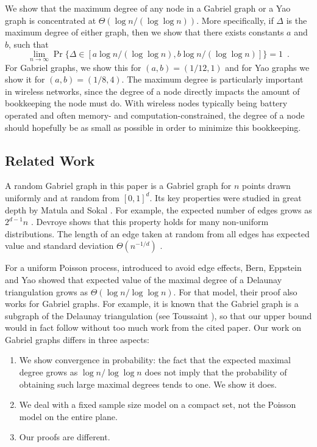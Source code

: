 \documentclass[lotsofwhite,charterfonts]{patmorin}
\newcommand{\PROB}{\Pr}
\begin{document}
We show that the maximum degree of any node in a Gabriel graph
or a Yao graph is concentrated at $\Theta(\log n/(\log\log n))$.
More specifically, if $\Delta$ is the maximum degree of either graph,
then we show that there exists constants $a$ and $b$, such that
\[
    \lim_{n\rightarrow\infty}
       \PROB\{\Delta\in [a\log n/(\log\log n), b\log n/(\log\log n)]\} = 1
       \enspace .
\]
For Gabriel graphs, we show this for $(a,b)=(1/12,1)$ and for Yao graphs
we show it for $(a,b)=(1/8,4)$.  The maximum degree is particularly
important in wireless networks, since the degree of a node directly impacts
the amount of bookkeeping the node must do.  With wireless nodes typically
being battery operated and often memory- and computation-constrained, the
degree of a node should hopefully be as small as possible in order to
minimize this bookkeeping.

\subsection{Related Work}

A random Gabriel graph in this paper is a Gabriel graph for $n$ points
drawn uniformly and at random from $[0,1]^d$.  Its key properties were
studied in great depth by Matula and Sokal \cite{ms80}.  For example, the
expected number of edges grows as $2^{d-1} n$ \cite{d88,ms80}.  Devroye
\cite{d88} shows that this property holds for many non-uniform
distributions.  The length of an edge taken at random from all edges has
expected value and standard deviation $\Theta\left(n^{-1/d}\right)$
\cite{d88}.

For a uniform Poisson process, introduced to avoid edge effects, Bern,
Eppstein and Yao \cite{bey91} showed that expected value of the maximal
degree of a Delaunay triangulation grows as $\Theta(\log n/\log\log n)$.
For that model, their proof also works for Gabriel graphs.  For example, it
is known that the Gabriel graph is a subgraph of the Delaunay triangulation
(see Toussaint \cite{t80b}), so that our upper bound would in fact follow
without too much work from the cited paper.  Our work on Gabriel graphs 
differs in three aspects:

\begin{enumerate}
\item We show convergence in probability: the fact that the expected
maximal degree grows as $\log n /\log \log n$ does not imply that the
probability of obtaining such large maximal degrees tends to one. We
show it does.

\item We deal with a fixed sample size model on a compact set, not the
Poisson model on the entire plane.

\item Our proofs are different.
\end{enumerate}
\end{document}
